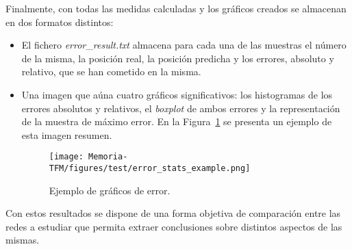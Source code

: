 Finalmente, con todas las medidas calculadas y los gráficos creados se almacenan en dos formatos distintos:
\begin{itemize}
    \item El fichero \textit{error}\_\textit{result.txt} almacena para cada una de las muestras el número de la misma, la posición real, la posición predicha y los errores, absoluto y relativo, que se han cometido en la misma.
    \item Una imagen que aúna cuatro gráficos significativos: los histogramas de los errores absolutos y relativos, el \textit{boxplot} de ambos errores y la representación de la muestra de máximo error. En la Figura~\ref{fig.test_example} se presenta un ejemplo de esta imagen resumen.
    \begin{figure}[H]
		\begin{center}
			\texttt{[image: Memoria-TFM/figures/test/error\_stats\_example.png]}
			\caption{Ejemplo de gráficos de error.}
			\label{fig.test_example}
		\end{center}
    \end{figure}
    \vspace{-10pt}
\end{itemize}

Con estos resultados se dispone de una forma objetiva de comparación entre las redes a estudiar que permita extraer conclusiones sobre distintos aspectos de las mismas.